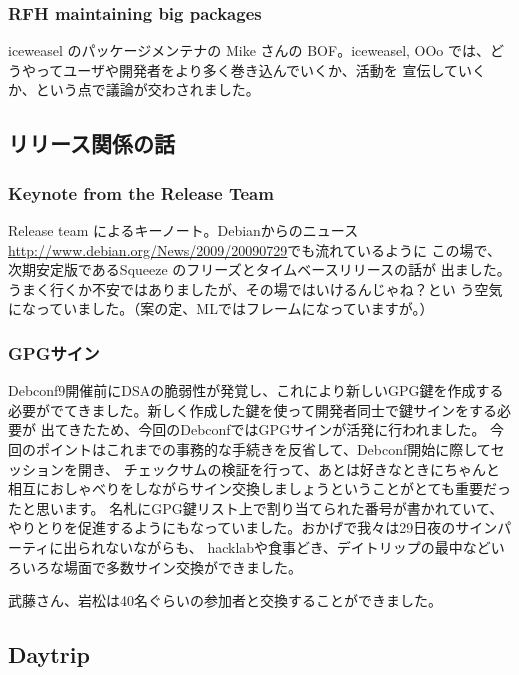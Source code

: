 \documentclass[mingoth,a4paper]{jsarticle}
\begin{document}
\subsubsection{RFH maintaining big packages}
       iceweasel のパッケージメンテナの Mike さんの BOF。iceweasel, OOo
       では、どうやってユーザや開発者をより多く巻き込んでいくか、活動を
       宣伝していくか、という点で議論が交わされました。

\subsection{リリース関係の話}
\subsubsection{Keynote from the Release Team}
Release team によるキーノート。Debianからのニュース
\url{http://www.debian.org/News/2009/20090729}でも流れているように
この場で、次期安定版であるSqueeze のフリーズとタイムベースリリースの話が
出ました。うまく行くか不安ではありましたが、その場ではいけるんじゃね？とい
う空気になっていました。（案の定、MLではフレームになっていますが。）

\subsubsection{GPGサイン}
Debconf9開催前にDSAの脆弱性が発覚し、これにより新しいGPG鍵を作成する
必要がでてきました。新しく作成した鍵を使って開発者同士で鍵サインをする必要が
出てきたため、今回のDebconfではGPGサインが活発に行われました。
今回のポイントはこれまでの事務的な手続きを反省して、Debconf開始に際してセッションを開き、
チェックサムの検証を行って、あとは好きなときにちゃんと相互におしゃべりをしながらサイン交換しましょうということがとても重要だったと思います。
名札にGPG鍵リスト上で割り当てられた番号が書かれていて、やりとりを促進するようにもなっていました。おかげで我々は29日夜のサインパーティに出られないながらも、
hacklabや食事どき、デイトリップの最中などいろいろな場面で多数サイン交換ができました。

武藤さん、岩松は40名ぐらいの参加者と交換することができました。



\subsection{Daytrip}
\end{document}
